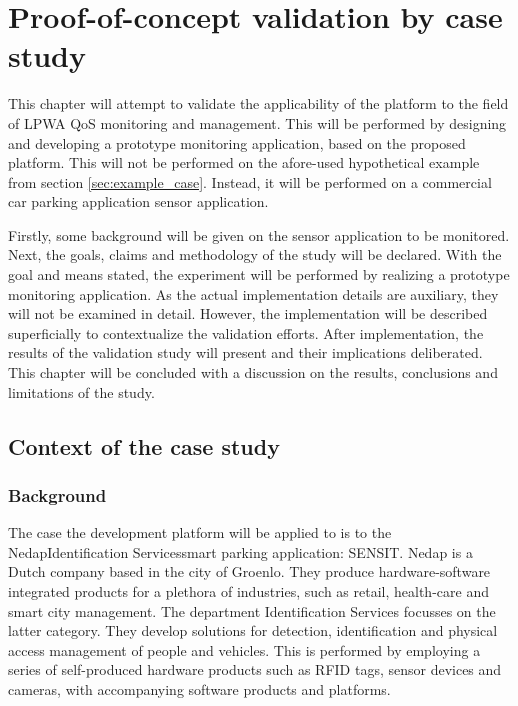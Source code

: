 \newcommand{\nedapidsystems}{\nedapidsystemsnospace\space}
\newcommand{\idsystems}{\idsystemsnospace\space}
\newcommand{\nedap}{\nedapnospace\space}
\newcommand{\ublox}{\ubloxnospace\space}
\newcommand{\sensit}{\sensitnospace\space}
\newcommand{\nedapidsystemsnospace}{\nedap\space\idsystems}
\newcommand{\idsystemsnospace}{Identification Services}
\newcommand{\nedapnospace}{Nedap}
\newcommand{\ubloxnospace}{u-blox}
\newcommand{\sensitnospace}{SENSIT}
\chapter{Proof-of-concept validation by case study}
\label{ch:validation}
This chapter will attempt to validate the applicability of the platform to the field of LPWA QoS monitoring and management. This will be performed by designing and developing a prototype monitoring application, based on the proposed platform. This will not be performed on the afore-used hypothetical example from section \ref{sec:example_case}. Instead, it will be performed on a commercial car parking application sensor application. 

Firstly, some background will be given on the sensor application to be monitored. Next, the goals, claims and methodology of the study will be declared. With the goal and means stated, the experiment will be performed by realizing a prototype monitoring application. As the actual implementation details are auxiliary, they will not be examined in detail. However, the implementation will be described superficially to contextualize the validation efforts. After implementation, the results of the validation study will present and their implications deliberated. This chapter will be concluded with a discussion on the results, conclusions and limitations of the study.
\section{Context of the case study}
\subsection{Background}
\label{sec:sensit}
The case the development platform will be applied to is to the \nedapidsystems smart parking application: \sensitnospace. \nedap\cite{web:nedap} is a Dutch company based in the city of Groenlo. They produce hardware-software integrated products for a plethora of industries, such as retail, health-care and smart city management. The department \idsystems\cite{web:idsystems} focusses on the latter category. They develop solutions for detection, identification and physical access management of people and vehicles. This is performed by employing a series of self-produced hardware products such as RFID tags, sensor devices and cameras, with accompanying software products and platforms. 
